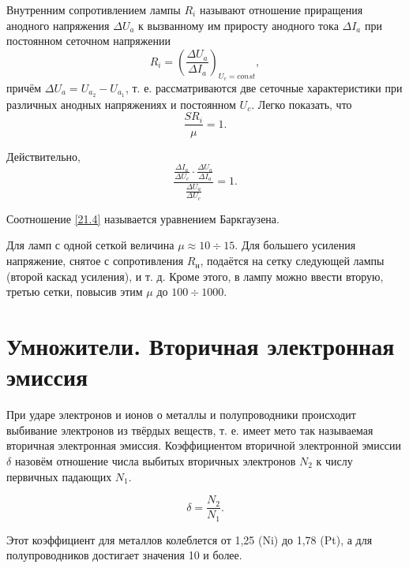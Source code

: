 \documentclass[a4paper,10pt]{book}
\begin{document}
Внутренним сопротивлением лампы $R_i$ называют отношение приращения анодного напряжения $\Delta U_a$ к вызванному им приросту анодного тока $\Delta I_a$ при постоянном сеточном напряжении\begin{equation}\label{21.3}
R_i = (\frac{\Delta U_a}{\Delta I_a})_{U_c=const},
\end{equation}
причём $\Delta U_a = U_{a_2}-U_{a_1}$, т. е. рассматриваются две сеточные характеристики при различных анодных напряжениях и постоянном $U_c$. Легко показать, что\begin{equation}\label{21.4}
\frac{S R_i}{\mu} = 1.
\end{equation}

Действительно, \begin{equation*}
\frac{\frac{\Delta I_a}{\Delta U_c}\cdot\frac{\Delta U_a}{\Delta I_a}}{\frac{\Delta U_a}{\Delta U_c}} = 1.
\end{equation*}

Соотношение \ref{21.4} называется уравнением Баркгаузена.

Для ламп с одной сеткой величина $\mu \approx 10 \div 15$. Для большего усиления напряжение, снятое с сопротивления $R_\text{н}$, подаётся на сетку следующей лампы (второй каскад усиления), и т. д. Кроме этого, в лампу можно ввести вторую, третью сетки, повысив этим $\mu$ до $100 \div 1000$.

\section{Умножители. Вторичная электронная эмиссия}

При ударе электронов и ионов о металлы и полупроводники происходит выбивание электронов из твёрдых веществ, т. е. имеет мето так называемая вторичная электронная эмиссия. Коэффициентом вторичной электронной эмиссии $\delta$ назовём отношение числа выбитых вторичных электронов $N_2$ к числу первичных падающих $N_1$.

\begin{equation}
\delta = \frac{N_2}{N_1}.
\end{equation}

Этот коэффициент для металлов колеблется от 1,25 (Ni) до 1,78 (Pt), а для полупроводников достигает значения 10 и более.
\end{document}
